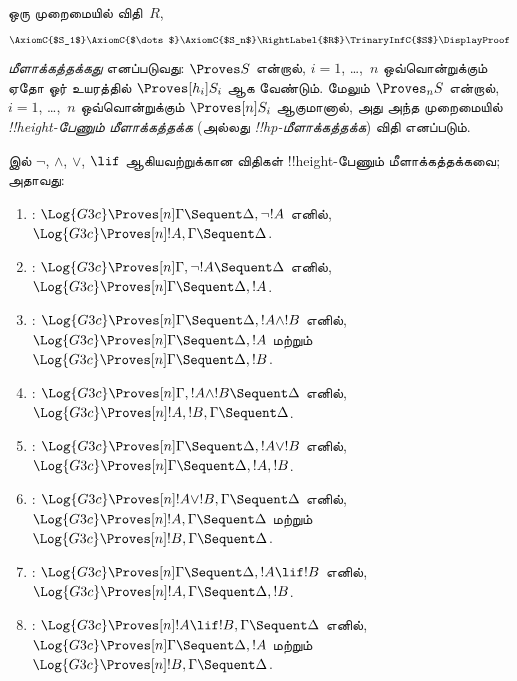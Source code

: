 \documentclass[../../../include/open-logic-section]{subfiles}
\begin{document}


\begin{defn}
ஒரு முறைமையில் விதி~$R$,
\[
\AxiomC{$S_1$}
\AxiomC{$\dots$}
\AxiomC{$S_n$}
\RightLabel{$R$}
\TrinaryInfC{$S$}
\DisplayProof
\]
\emph{மீளாக்கத்தக்கது} எனப்படுவது:
$\Proves S$ என்றால், $i = 1$, \dots,~$n$
ஒவ்வொன்றுக்கும் ஏதோ ஓர் உயரத்தில்
$\Proves[h_i] S_i$ ஆக வேண்டும்.
மேலும் $\Proves_n S$ என்றால்,
$i = 1$, \dots,~$n$ ஒவ்வொன்றுக்கும்
$\Proves[n] S_i$ ஆகுமானால்,
அது அந்த முறைமையில்
\emph{!!{height}-பேணும் மீளாக்கத்தக்க}
(அல்லது \emph{!!{hp}-மீளாக்கத்தக்க})
விதி எனப்படும்.
\end{defn}

\begin{lem}
 இல் $\lnot$, $\land$, $\lor$,
$\lif$ ஆகியவற்றுக்கான விதிகள்
!!{height}-பேணும் மீளாக்கத்தக்கவை;
அதாவது:
\begin{enumerate}
  \item \RightR{\lnot}: $ \Log{G3c} \Proves[n] \Gamma \Sequent
  \Delta, \lnot !A$ எனில், $\Log{G3c} \Proves[n] !A, \Gamma \Sequent
  \Delta$.
  \item \LeftR{\lnot}: $\Log{G3c} \Proves[n] \Gamma, \lnot !A
  \Sequent \Delta$ எனில், $\Log{G3c} \Proves[n] \Gamma \Sequent \Delta,
  !A$.
  \item \RightR{\land}: $\Log{G3c} \Proves[n] \Gamma \Sequent
  \Delta, !A \land !B$ எனில், $\Log{G3c} \Proves[n] \Gamma \Sequent
  \Delta, !A$ மற்றும் $\Log{G3c} \Proves[n] \Gamma \Sequent
  \Delta, !B$.
  \item \LeftR{\land}: $\Log{G3c} \Proves[n] \Gamma, !A \land !B
  \Sequent \Delta$ எனில், $\Log{G3c} \Proves[n] !A, !B, \Gamma \Sequent
  \Delta$.
  \item \RightR{\lor}: $\Log{G3c} \Proves[n] \Gamma \Sequent
  \Delta, !A \lor !B$ எனில், $\Log{G3c} \Proves[n] \Gamma \Sequent
  \Delta, !A, !B$.
  \item \LeftR{\lor}: $\Log{G3c} \Proves[n] !A \lor !B, \Gamma \Sequent
  \Delta$ எனில், $\Log{G3c} \Proves[n] !A, \Gamma \Sequent
  \Delta$ மற்றும் $\Log{G3c} \Proves[n] !B, \Gamma \Sequent
  \Delta$.
  \item \RightR{\lif}: $\Log{G3c} \Proves[n] \Gamma \Sequent
  \Delta, !A \lif !B$ எனில், $\Log{G3c} \Proves[n] !A, \Gamma \Sequent
  \Delta, !B$.
  \item \LeftR{\lif}: $\Log{G3c} \Proves[n] !A \lif !B, \Gamma
  \Sequent \Delta$ எனில், $\Log{G3c} \Proves[n] \Gamma \Sequent \Delta,
  !A$ மற்றும் $\Log{G3c} \Proves[n] !B, \Gamma \Sequent \Delta$.
\end{enumerate}
\end{lem}
\end{document}

